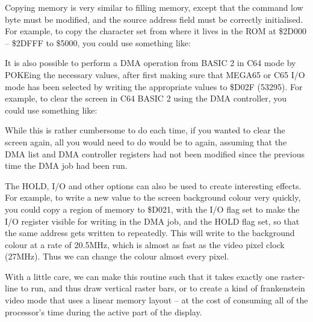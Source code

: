 Copying memory is very similar to filling memory, except that the command
low byte must be modified, and the source address field must be correctly initialised.
For example, to copy the character set from where it lives in the ROM at \$2D000 -- \$2DFFF
to \$5000, you could use something like:


It is also possible to perform a DMA operation from BASIC 2 in C64
mode by POKEing the necessary values, after first making sure that
MEGA65 or C65 I/O mode has been selected by writing the appropriate
values to \$D02F (53295). For example, to clear the screen in C64 BASIC 2
using the DMA controller, you could use something like:



While this is rather cumbersome to do each time, if you wanted to clear
the screen again, all you would need to do would be to  again,
assuming that the DMA list and DMA controller registers had not been modified
since the previous time the DMA job had been run.

The HOLD, I/O and other options can also be used to create interesting effects.
For example, to write a new value to the screen background colour very quickly,
you could copy a region of memory to \$D021, with the I/O flag set to make the I/O
register visible for writing in the DMA job, and the HOLD flag set, so that the
same address gets written to repeatedly. This will write to the background colour
at a rate of 20.5MHz, which is almost as fast as the video pixel clock (27MHz).
Thus we can change the colour almost every pixel.

With a little care, we can make this routine such that it takes exactly one raster-line
to run, and thus draw vertical raster bars, or to create a kind of frankenstein video mode
that uses a linear memory layout -- at the cost of consuming all of the processor's time
during the active part of the display.

